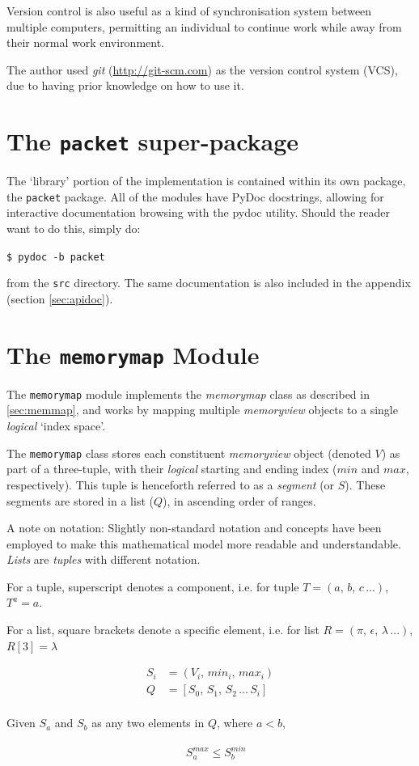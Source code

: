 \documentclass[10pt,a4paper,notitlepage]{report}
\begin{document}
Version control is also useful as a kind of synchronisation system between multiple computers, permitting an individual to continue work while away from their normal work environment.

The author used \emph{git} (\url{http://git-scm.com}) as the version control system (VCS), due to having prior knowledge on how to use it.

\section{The \texttt{packet} super-package}
The `library' portion of the implementation is contained within its own package, the \texttt{packet} package. All of the modules have PyDoc docstrings, allowing for interactive documentation browsing with the pydoc utility. Should the reader want to do this, simply do:

\texttt{\$ pydoc -b packet}

from the \texttt{src} directory. The same documentation is also included in the appendix (section \ref{sec:apidoc}).

\section{The \texttt{memorymap} Module}
The \texttt{memorymap} module implements the \emph{memorymap} class as described in \ref{sec:memmap}, and works by mapping multiple \emph{memoryview} objects to a single \emph{logical} `index space'.

The \texttt{memorymap} class stores each constituent \emph{memoryview} object (denoted $V$) as part of a three-tuple,  with their \emph{logical} starting and ending index ($min$ and $max$, respectively). This tuple is henceforth referred to as a \emph{segment} (or $S$). These segments are stored in a list ($Q$), in ascending order of ranges.

{\small
A note on notation: Slightly non-standard notation and concepts have been employed to make this mathematical model more readable and understandable. \emph{Lists} are \emph{tuples} with different notation.

For a tuple, superscript denotes a component, i.e.  for tuple $T = (a,\, b,\, c\, ...)$,   $T^{a} = a$.

For a list, square brackets denote a specific element, i.e. for list $R = (\pi,\, \epsilon,\, \lambda\, ...)$, $R[3] = \lambda$
}

\begin{align*}
S_{i} &= ( V_{i},\, min_{i},\, max_{i} )\\
Q &= [ S_{0},\, S_{1},\, S_{2}\, ... \,S_{i} ]\\
\end{align*}
\begin{center}
Given $S_{a}$ and $S_{b}$ as any two elements in $Q$, where $a < b$,
\end{center}
\begin{align*}
&\ S_{a}^{max} \leq S_{b}^{min} 
\end{align*}
\end{document}
